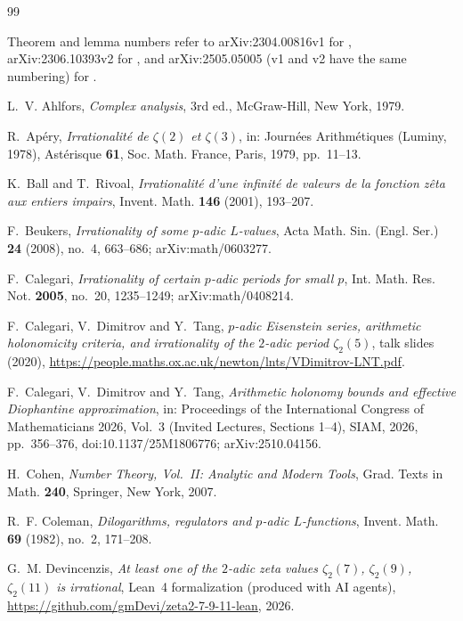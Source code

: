 \documentclass{amsart}
\theoremstyle{definition}
\theoremstyle{remark}
\numberwithin{equation}{section}
\begin{document}
\raggedright
\begin{thebibliography}{99}
\small
\item[] Theorem and lemma numbers refer to arXiv:2304.00816v1 for
\cite{Lai25}, arXiv:2306.10393v2 for \cite{LS25}, and arXiv:2505.05005 (v1
and v2 have the same numbering) for \cite{LSZ26}.

L.~V. Ahlfors, \emph{Complex analysis}, 3rd ed., McGraw-Hill, New York, 1979.

R.~Ap\'ery, \emph{Irrationalit\'e de $\zeta(2)$ et $\zeta(3)$}, in: Journ\'ees
Arithm\'etiques (Luminy, 1978), Ast\'erisque \textbf{61}, Soc. Math. France,
Paris, 1979, pp.~11--13.

K.~Ball and T.~Rivoal, \emph{Irrationalit\'e d'une infinit\'e de valeurs de la
fonction z\^eta aux entiers impairs}, Invent. Math. \textbf{146} (2001),
193--207.

F.~Beukers, \emph{Irrationality of some $p$-adic $L$-values}, Acta Math. Sin.
(Engl. Ser.) \textbf{24} (2008), no.~4, 663--686; arXiv:math/0603277.

F.~Calegari, \emph{Irrationality of certain $p$-adic periods for small $p$},
Int. Math. Res. Not. \textbf{2005}, no.~20, 1235--1249; arXiv:math/0408214.

F.~Calegari, V.~Dimitrov and Y.~Tang, \emph{$p$-adic Eisenstein series,
arithmetic holonomicity criteria, and irrationality of the $2$-adic period
$\zeta_2(5)$}, talk slides (2020),
\url{https://people.maths.ox.ac.uk/newton/lnts/VDimitrov-LNT.pdf}.

F.~Calegari, V.~Dimitrov and Y.~Tang, \emph{Arithmetic holonomy bounds and
effective Diophantine approximation}, in: Proceedings of the International
Congress of Mathematicians 2026, Vol.~3 (Invited Lectures, Sections 1--4),
SIAM, 2026, pp.~356--376, doi:10.1137/25M1806776; arXiv:2510.04156.

H.~Cohen, \emph{Number Theory, Vol.~II: Analytic and Modern Tools}, Grad. Texts
in Math. \textbf{240}, Springer, New York, 2007.

R.~F. Coleman, \emph{Dilogarithms, regulators and $p$-adic $L$-functions},
Invent. Math. \textbf{69} (1982), no.~2, 171--208.

G.~M. Devincenzis, \emph{At least one of the $2$-adic zeta values $\zeta_2(7)$,
$\zeta_2(9)$, $\zeta_2(11)$ is irrational}, Lean~4 formalization (produced with
AI agents), \url{https://github.com/gmDevi/zeta2-7-9-11-lean}, 2026.


\end{thebibliography}
\end{document}
